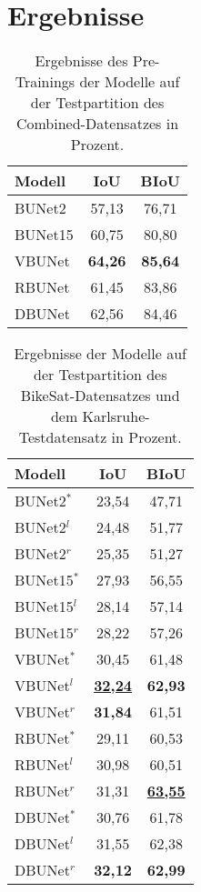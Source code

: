 \chapter{Ergebnisse} \label{sec:results}

\begin{table}[ht]
	\centering
	\begin{tabular}{l|c|c}
		Modell & \ac{IoU} & \ac{BIoU} \\
		\midrule
        BUNet2 & 57,13 & 76,71 \\ 
        BUNet15 & 60,75 & 80,80 \\ 
        VBUNet & \textbf{64,26} & \textbf{85,64} \\ 
        RBUNet & 61,45 & 83,86 \\ 
        DBUNet & 62,56 & 84,46 \\ 
        
	\end{tabular}
	\caption{Ergebnisse des Pre-Trainings der Modelle auf der Testpartition des Combined-Datensatzes in Prozent.}
	\label{tab:results-roads}
\end{table}

\begin{table}[ht]
	\centering
	\begin{tabular}{l|c|c}
		Modell & \ac{IoU} & \ac{BIoU} \\
		\midrule
        BUNet2$^*$ & 23,54 & 47,71 \\ 
        BUNet2$^l$ & 24,48 & 51,77 \\ 
        BUNet2$^r$ & 25,35 & 51,27 \\ 
		\midrule

        BUNet15$^*$ & 27,93 & 56,55 \\ 
        BUNet15$^l$ & 28,14 & 57,14 \\ 
        BUNet15$^r$ & 28,22 & 57,26 \\ 
		\midrule

        VBUNet$^*$ & 30,45 & 61,48 \\ 
        VBUNet$^l$ & \underline{\textbf{32,24}} & \textbf{62,93} \\ 
        VBUNet$^r$ & \textbf{31,84} & 61,51 \\ 
		\midrule

        RBUNet$^*$ & 29,11 & 60,53 \\ 
        RBUNet$^l$ & 30,98 & 60,51 \\ 
        RBUNet$^r$ & 31,31 & \underline{\textbf{63,55}} \\ 
		\midrule

        DBUNet$^*$ & 30,76 & 61,78 \\ 
        DBUNet$^l$ & 31,55 & 62,38 \\ 
        DBUNet$^r$ & \textbf{32,12} & \textbf{62,99} \\ 
        
	\end{tabular}
	\caption{Ergebnisse der Modelle auf der Testpartition des BikeSat-Datensatzes und dem Karlsruhe-Testdatensatz 
    in Prozent.}
	\label{tab:results}
\end{table}

